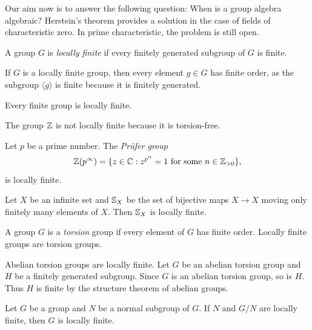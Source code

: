 Our aim now is to answer the following question: When is 
a group algebra algebraic? Herstein's theorem provides
a solution in the case of fields of characteristic zero. In prime characteristic,
the problem is still open. 

\begin{definition}
	A group $G$ is \emph{locally finite} if every finitely generated 
	subgroup of $G$ is finite. 
\end{definition}

If $G$ is a locally finite group, then every element $g\in G$ has finite order, as
the subgroup $\langle g\rangle$ is finite because it is finitely generated.

\begin{example}
    Every finite group is locally finite.
\end{example}

\begin{example}
    The group $\mathbb{Z}$ is not locally finite because it is torsion-free.
\end{example}

\begin{example}
	Let $p$ be a prime number. 
	The \emph{Pr\"ufer group}  
	\[
		\mathbb{Z}(p^{\infty})=\{z\in\mathbb{C}:z^{p^n}=1\text{ for some $n\in\mathbb{Z}_{>0}$}\}, 
	\]
	is locally finite. 
\end{example}

\begin{example}
	Let $X$ be an infinite set and $\mathbb{S}_X$ be the set of bijective maps $X\to
	X$ moving only finitely many elements of $X$. Then 
	$\mathbb{S}_X$ is locally finite.
\end{example}

A group $G$ is a \emph{torsion} group if every element of $G$
has finite order. Locally finite groups are torsion groups. 

\begin{example}
    Abelian torsion groups are locally finite. Let $G$ be an abelian torsion group
    and $H$ be a finitely generated subgroup. Since $G$ is an abelian torsion group, so is $H$. Thus
    $H$ is finite by the structure theorem of abelian groups. 
\end{example}

\begin{proposition}
\label{pro:exact_LI}
	Let $G$ be a group and $N$ be a normal subgroup of $G$. If $N$ and $G/N$
	are locally finite, then $G$ is locally finite.
\end{proposition}

